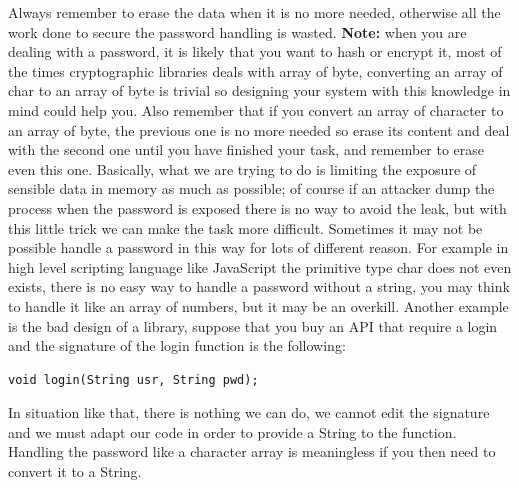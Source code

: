 Always remember to erase the data when it is no more needed, otherwise all the work done to secure the password handling is wasted.\newline
\textbf{Note:} when you are dealing with a password, it is likely that you want to hash or encrypt it, most of the times cryptographic libraries deals with array of byte, converting an array of char to an array of byte is trivial so designing your system with this knowledge in mind could help you.\newline
Also remember that if you convert an array of character to an array of byte, the previous one is no more needed so erase its content and deal with the second one until you have finished your task, and remember to erase even this one.\newline
Basically, what we are trying to do is limiting the exposure of sensible data in memory as much as possible; of course if an attacker dump the process when the password is exposed there is no way to avoid the leak, but with this little trick we can make the task more difficult.\newline
Sometimes it may not be possible handle a password in this way for lots of different reason.\newline
For example in high level scripting language like JavaScript the primitive type char does not even exists, there is no easy way to handle a password without a string, you may think to handle it like an array of numbers, but it may be an overkill.\newline
Another example is the bad design of a library, suppose that you buy an API that require a login and the signature of the login function is the following:
\begin{lstlisting}
void login(String usr, String pwd);
\end{lstlisting}

In situation like that, there is nothing we can do, we cannot edit the signature and we must adapt our code in order to provide a String to the function.\newline
Handling the password like a character array is meaningless if you then need to convert it to a String.\newline

